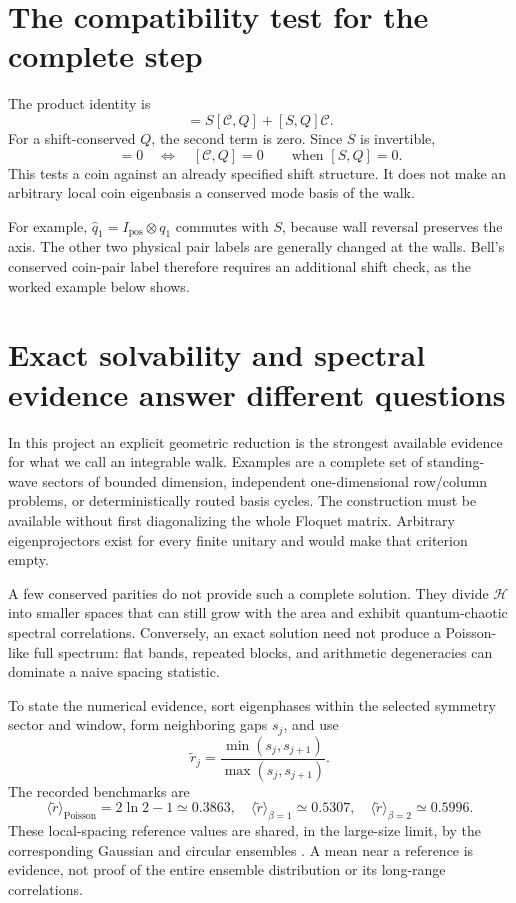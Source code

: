 \documentclass[11pt,a4paper,oneside]{report}
\newcommand{\HH}{\mathcal H}
\newcommand{\CC}{\mathcal C}
\newcommand{\Id}{I}
\numberwithin{equation}{chapter}
\begin{document}
\section{The compatibility test for the complete step}

The product identity is
\begin{equation}
[U,Q]=S[\CC,Q]+[S,Q]\CC.
\end{equation}
For a shift-conserved \(Q\), the second term is zero. Since \(S\)
is invertible,
\begin{equation}
[U,Q]=0\quad\Longleftrightarrow\quad[\CC,Q]=0
\qquad\text{when }[S,Q]=0.
\end{equation}
This tests a coin against an already specified shift structure.
It does not make an arbitrary local coin eigenbasis a conserved
mode basis of the walk.

For example, \(\widehat q_1=\Id_{\mathrm{pos}}\otimes q_1\) commutes
with \(S\), because wall reversal preserves the axis. The other two
physical pair labels are generally changed at the walls. Bell's
conserved coin-pair label therefore requires an additional shift
check, as the worked example below shows.

\section{Exact solvability and spectral evidence answer different questions}

In this project an explicit geometric reduction is the strongest
available evidence for what we call an integrable walk. Examples are a
complete set of standing-wave sectors of bounded dimension, independent
one-dimensional row/column problems, or deterministically routed basis
cycles. The construction must be available without first diagonalizing
the whole Floquet matrix. Arbitrary eigenprojectors exist for every
finite unitary and would make that criterion empty.

A few conserved parities do not provide such a complete solution.
They divide \(\HH\) into smaller spaces that can still grow with
the area and exhibit quantum-chaotic spectral correlations.
Conversely, an exact solution need not produce a Poisson-like full
spectrum: flat bands, repeated blocks, and arithmetic degeneracies
can dominate a naive spacing statistic.

To state the numerical evidence, sort eigenphases within the selected
symmetry sector and window, form neighboring gaps \(s_j\), and use
\begin{equation}
\widetilde r_j=\frac{\min(s_j,s_{j+1})}{\max(s_j,s_{j+1})}.
\end{equation}
The recorded benchmarks are
\begin{equation}
\langle\widetilde r\rangle_{\mathrm{Poisson}}=2\ln2-1\simeq0.3863,
\quad \langle\widetilde r\rangle_{\beta=1}\simeq0.5307,
\quad \langle\widetilde r\rangle_{\beta=2}\simeq0.5996.
\end{equation}
These local-spacing reference values are shared, in the large-size
limit, by the corresponding Gaussian and circular ensembles
\cite{atas}. A mean near a reference is evidence, not proof of the
entire ensemble distribution or its long-range correlations.
\end{document}
